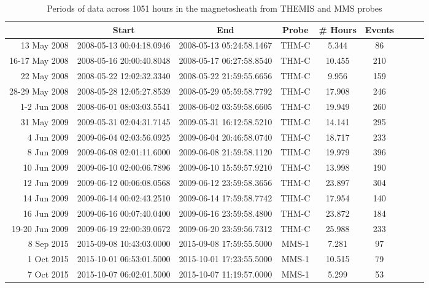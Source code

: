 \begin{longtable}{r|cccccccc}
\caption{Periods of data across 1051 hours in the magnetosheath from THEMIS and MMS probes} \\
\hline
{} &                     Start &                       End &  Probe &  \# Hours & Events \\
\hline
13 May 2008    &  2008-05-13 00:04:18.0946 &  2008-05-13 05:24:58.1467 &  THM-C &    5.344 &     86 \\
16-17 May 2008 &  2008-05-16 20:00:40.8048 &  2008-05-17 06:27:58.8540 &  THM-C &   10.455 &    210 \\
22 May 2008    &  2008-05-22 12:02:32.3340 &  2008-05-22 21:59:55.6656 &  THM-C &    9.956 &    159 \\
28-29 May 2008 &  2008-05-28 12:05:27.8539 &  2008-05-29 05:59:58.7792 &  THM-C &   17.908 &    246 \\
1-2 Jun 2008   &  2008-06-01 08:03:03.5541 &  2008-06-02 03:59:58.6605 &  THM-C &   19.949 &    260 \\
31 May 2009    &  2009-05-31 02:04:31.7145 &  2009-05-31 16:12:58.5210 &  THM-C &   14.141 &    295 \\
4 Jun 2009     &  2009-06-04 02:03:56.0925 &  2009-06-04 20:46:58.0740 &  THM-C &   18.717 &    233 \\
8 Jun 2009     &  2009-06-08 02:01:11.6000 &  2009-06-08 21:59:58.1120 &  THM-C &   19.979 &    396 \\
10 Jun 2009    &  2009-06-10 02:00:06.7896 &  2009-06-10 15:59:57.9210 &  THM-C &   13.998 &    190 \\
12 Jun 2009    &  2009-06-12 00:06:08.0568 &  2009-06-12 23:59:58.3656 &  THM-C &   23.897 &    304 \\
14 Jun 2009    &  2009-06-14 00:02:43.2510 &  2009-06-14 17:59:58.7742 &  THM-C &   17.954 &    140 \\
16 Jun 2009    &  2009-06-16 00:07:40.0400 &  2009-06-16 23:59:58.4800 &  THM-C &   23.872 &    184 \\
19-20 Jun 2009 &  2009-06-19 22:00:39.0672 &  2009-06-20 23:59:56.7312 &  THM-C &   25.988 &    233 \\
8 Sep 2015     &  2015-09-08 10:43:03.0000 &  2015-09-08 17:59:55.5000 &  MMS-1 &    7.281 &     97 \\
1 Oct 2015     &  2015-10-01 06:53:01.5000 &  2015-10-01 17:23:55.5000 &  MMS-1 &   10.515 &     79 \\
7 Oct 2015     &  2015-10-07 06:02:01.5000 &  2015-10-07 11:19:57.0000 &  MMS-1 &    5.299 &     53 \\

\end{longtable}

